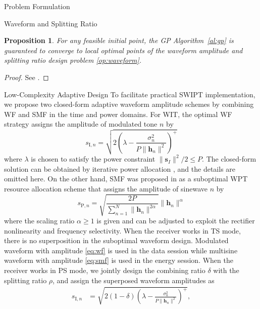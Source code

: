 \documentclass[journal]{IEEEtran}
\newtheorem{proposition}{Proposition}
\begin{document}
\begin{section}{Problem Formulation}
\begin{subsection}{Waveform and Splitting Ratio}
			\begin{proposition}\label{pr:gp}
				For any feasible initial point, the GP Algorithm~\ref{al:gp} is guaranteed to converge to local optimal points of the waveform amplitude and splitting ratio design problem \eqref{op:waveform}.
			\end{proposition}

			\begin{proof}\label{pf:gp}
				See \cite{Clerckx2016a,Clerckx2018b}.
			\end{proof}
		\end{subsection}


		\begin{subsection}{Low-Complexity Adaptive Design}
			To facilitate practical SWIPT implementation, we propose two closed-form adaptive waveform amplitude schemes by combining WF and SMF in the time and power domains. For WIT, the optimal WF strategy assigns the amplitude of modulated tone $n$ by
			\begin{equation}\label{eq:wf}
				s_{\mathrm{I}, n} = \sqrt{2\left(\lambda - \frac{\sigma_n^2}{P \lVert{\boldsymbol{h}_n}\rVert^2}\right)^+}
			\end{equation}
			where $\lambda$ is chosen to satisfy the power constraint $\lVert{\boldsymbol{s}_I}\rVert^2 / 2 \le P$. The closed-form solution can be obtained by iterative power allocation \cite{Tse2005}, and the details are omitted here. On the other hand, SMF was proposed in \cite{Clerckx2017} as a suboptimal WPT resource allocation scheme that assigns the amplitude of sinewave $n$ by
			\begin{equation}\label{eq:smf}
				s_{\mathrm{P}, n} = \sqrt{\frac{2 P}{\sum_{n=1}^N \lVert{\boldsymbol{h}_n \rVert^{2 \alpha}}}}\lVert{\boldsymbol{h}_n}\rVert^\alpha
			\end{equation}
			where the scaling ratio $\alpha \ge 1$ is given and can be adjusted to exploit the rectifier nonlinearity and frequency selectivity. When the receiver works in TS mode, there is no superposition in the suboptimal waveform design. Modulated waveform with amplitude \eqref{eq:wf} is used in the data session while multisine waveform with amplitude \eqref{eq:smf} is used in the energy session. When the receiver works in PS mode, we jointly design the combining ratio $\delta$ with the splitting ratio $\rho$, and assign the superposed waveform amplitudes as
			\begin{align}
				s_{\mathrm{I}, n} &= \sqrt{2(1 - \delta)\left(\lambda - \frac{\sigma_n^2}{P \lVert{\boldsymbol{h}_n}\rVert^2}\right)^+}, \label{eq:s_i}\\

\end{align}
\end{subsection}
\end{section}
\end{document}
